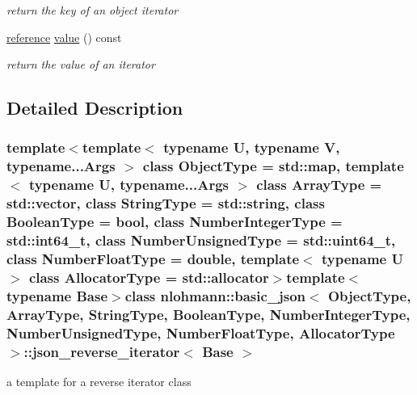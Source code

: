 \begin{DoxyCompactItemize}
\begin{DoxyCompactList}\small\item\em return the key of an object iterator \end{DoxyCompactList}\item 
\hypertarget{classnlohmann_1_1basic__json_1_1json__reverse__iterator_aca5116682e206dac48f8a56716a3280b_aca5116682e206dac48f8a56716a3280b}{\hyperlink{classnlohmann_1_1basic__json_1_1json__reverse__iterator_a7265535f39299824f9712a2ca15013c3_a7265535f39299824f9712a2ca15013c3}{reference} \hyperlink{classnlohmann_1_1basic__json_1_1json__reverse__iterator_aca5116682e206dac48f8a56716a3280b_aca5116682e206dac48f8a56716a3280b}{value} () const }\label{classnlohmann_1_1basic__json_1_1json__reverse__iterator_aca5116682e206dac48f8a56716a3280b_aca5116682e206dac48f8a56716a3280b}

\begin{DoxyCompactList}\small\item\em return the value of an iterator \end{DoxyCompactList}\end{DoxyCompactItemize}


\subsection{Detailed Description}
\subsubsection*{template$<$template$<$ typename U, typename V, typename...\-Args $>$ class Object\-Type = std\-::map, template$<$ typename U, typename...\-Args $>$ class Array\-Type = std\-::vector, class String\-Type = std\-::string, class Boolean\-Type = bool, class Number\-Integer\-Type = std\-::int64\-\_\-t, class Number\-Unsigned\-Type = std\-::uint64\-\_\-t, class Number\-Float\-Type = double, template$<$ typename U $>$ class Allocator\-Type = std\-::allocator$>$template$<$typename Base$>$class nlohmann\-::basic\-\_\-json$<$ Object\-Type, Array\-Type, String\-Type, Boolean\-Type, Number\-Integer\-Type, Number\-Unsigned\-Type, Number\-Float\-Type, Allocator\-Type $>$\-::json\-\_\-reverse\-\_\-iterator$<$ Base $>$}

a template for a reverse iterator class 


